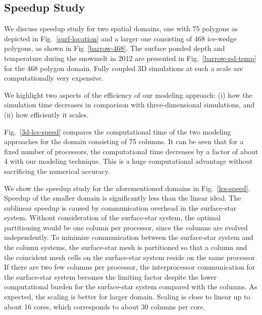\documentclass[review]{elsarticle}
\begin{document}

\subsection{Speedup Study}
We discuss speedup study for two spatial domains, one with 75 polygons as depicted in Fig.~\ref{surf-location} and a larger one consisting of 468 ice-wedge polygons, as shown in Fig~\ref{barrow-468}. The surface ponded depth and temperature during the snowmelt in 2012 are presented in Fig.~\ref{barrow-pd-temp} for the 468 polygon domain. Fully coupled 3D simulations at such a scale are computationally very expensive.

We highlight two aspects of the efficiency of our modeling approach: (i) how the simulation time decreases in comparison with three-dimensional simulations, and (ii) how efficiently it scales. 

Fig.~\ref{3d-lcs-speed} compares the computational time of the two modeling approaches for the domain consisting of 75 columns. 
It can be seen that for a fixed number of processors, the computational time decreases by a factor of about 4 with our modeling technique. This is a huge computational advantage without sacrificing the numerical accuracy. 

We show the speedup study for the aforementioned domains in Fig.~\ref{lcs-speed}. Speedup of the smaller domain is significantly less than the linear ideal. The sublinear speedup is caused by communication overhead in the surface-star system. Without consideration of the surface-star system, the optimal partitioning would be one column per processor, since the columns are evolved independently. To minimize communication between the surface-star system and the column systems, the surface-star mesh is partitioned so that a column and the coincident mesh cells on the surface-star system reside on the same processor. If there are two few columns per processor, the interprocessor communication for the surface-star system becomes the limiting factor despite the lower computational burden for the surface-star system compared with the columns. 
As expected, the scaling is better for larger domain. Scaling is close to linear up to about 16 cores, which corresponds to about 30 columns per core. 
\end{document}
